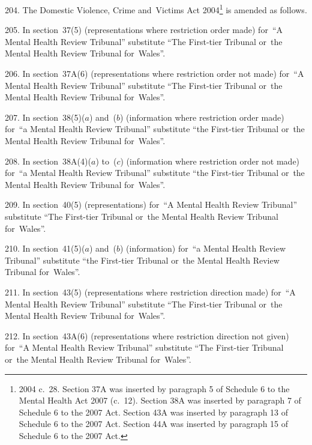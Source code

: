 \documentclass[12pt,a4paper]{article}
\begin{document}
204.  The Domestic Violence, Crime and~Victims Act 2004\footnote{2004 c.~28. Section 37A was inserted by paragraph 5 of Schedule 6 to the Mental Health Act 2007 (c.~12). Section 38A was inserted by paragraph 7 of Schedule 6 to the 2007 Act. Section 43A was inserted by paragraph 13 of Schedule 6 to the 2007 Act. Section 44A was inserted by paragraph 15 of Schedule 6 to the 2007 Act.} is amended as follows.

\medskip

205.  In section~37(5) (representations where restriction order made) for~“A Mental Health Review Tribunal” substitute “The First-tier Tribunal or~the Mental Health Review Tribunal for~Wales”.

\medskip

206.  In section~37A(6) (representations where restriction order not made) for~“A Mental Health Review Tribunal” substitute “The First-tier Tribunal or~the Mental Health Review Tribunal for~Wales”.

\medskip

207.  In section~38(5)($a$)  and~($b$)  (information where restriction order made) for~“a Mental Health Review Tribunal” substitute “the First-tier Tribunal or~the Mental Health Review Tribunal for~Wales”.

\medskip

208.  In section~38A(4)($a$)  to~($c$)  (information where restriction order not made) for~“a Mental Health Review Tribunal” substitute “the First-tier Tribunal or~the Mental Health Review Tribunal for~Wales”.

\medskip

209.  In section~40(5) (representations) for~“A Mental Health Review Tribunal” substitute “The First-tier Tribunal or~the Mental Health Review Tribunal for~Wales”.

\medskip

210.  In section~41(5)($a$)  and~($b$)  (information) for~“a Mental Health Review Tribunal” substitute “the First-tier Tribunal or~the Mental Health Review Tribunal for~Wales”.

\medskip

211.  In section~43(5) (representations where restriction direction made) for~“A Mental Health Review Tribunal” substitute “The First-tier Tribunal or~the Mental Health Review Tribunal for~Wales”.

\medskip

212.  In section~43A(6) (representations where restriction direction not given) for~“A Mental Health Review Tribunal” substitute “The First-tier Tribunal or~the Mental Health Review Tribunal for~Wales”.
\end{document}
